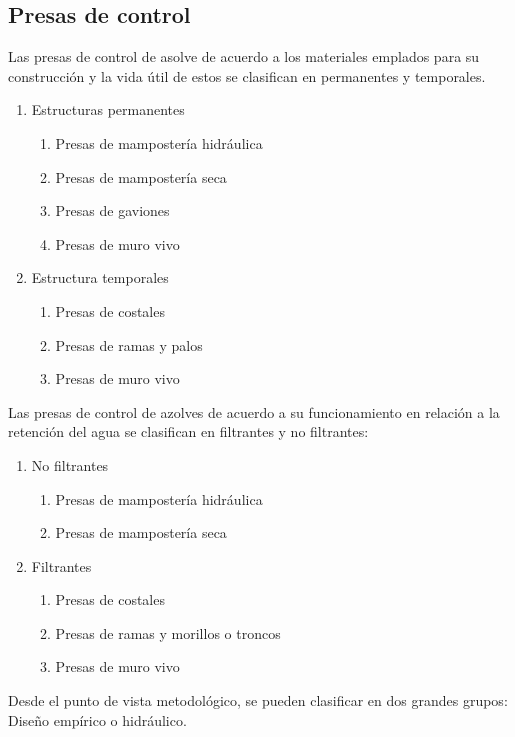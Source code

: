     \subsection{Presas de control}
    Las presas de control de asolve de acuerdo a los materiales emplados para su construcción y la vida útil de estos se clasifican en permanentes y temporales.
    \begin{enumerate}
        \item Estructuras permanentes \begin{enumerate}
            \item Presas de mampostería hidráulica
            \item Presas de mampostería seca
            \item Presas de gaviones
            \item Presas de muro vivo
        \end{enumerate}
        \item Estructura temporales \begin{enumerate}
            \item Presas de costales
            \item Presas de ramas y palos
            \item Presas de muro vivo
        \end{enumerate}
    \end{enumerate}
    Las presas de control de azolves de acuerdo a su funcionamiento en relación a la retención del agua se clasifican en filtrantes y no filtrantes:
    \begin{enumerate}
        \item No filtrantes \begin{enumerate}
            \item Presas de mampostería hidráulica
            \item Presas de mampostería seca
        \end{enumerate}
        \item Filtrantes \begin{enumerate}
            \item Presas de costales
            \item Presas de ramas y morillos o troncos
            \item Presas de muro vivo
        \end{enumerate}
    \end{enumerate}
    Desde el punto de vista metodológico, se pueden clasificar en dos grandes grupos: Diseño empírico o hidráulico.
    
